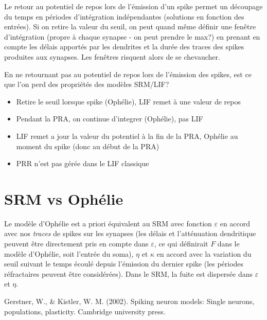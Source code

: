 \documentclass{article}
\begin{document}
	Le retour au potentiel de repos lors de l'émission d'un spike permet un découpage du temps en périodes d'intégration indépendantes (solutions en fonction des entrées). Si on retire la valeur du seuil, on peut quand même définir une fenêtre d'intégration (propre à chaque synapse - on peut prendre le max?) en prenant en compte les délais apportés par les dendrites et la durée des traces des spikes produites aux synapses. Les fenêtres risquent alors de se chevaucher. 

	En ne retournant pas au potentiel de repos lors de l'émission des spikes, est ce que l'on perd des propriétés des modèles SRM/LIF?

	\begin{itemize}
		\item Retire le seuil lorsque spike (Oph\'elie), LIF remet \`a une valeur de repos
		\item Pendant la PRA, on continue d'integrer (Oph\'elie), pas LIF
		\item LIF remet a jour la valeur du potentiel \`a la fin de la PRA, Oph\'elie au moment du spike (donc au d\'ebut de la PRA)
		\item PRR n'est pas g\'er\'ee dans le LIF classique
	\end{itemize}

\section*{SRM vs Ophélie}
	Le modèle d'Ophélie est a priori équivalent au SRM avec fonction $\varepsilon$ en accord avec nos \emph{traces} de spikes sur les synapses (les délais et l'atténuation dendritique peuvent être directement pris en compte dans $\varepsilon$, ce qui définirait $F$ dans le modèle d'Ophélie, soit l'entrée du soma), $\eta$ et $\kappa$ en accord avec la variation du seuil suivant le temps écoulé depuis l'émission du dernier spike (les périodes réfractaires peuvent être considérées). 
	Dans le SRM, la fuite est dispersée dans $\varepsilon$ et $\eta$.


	

	\begin{thebibliography}{10}
		 Gerstner, W., \& Kistler, W. M. (2002). Spiking neuron models: Single neurons, populations, plasticity. Cambridge university press.
	\end{thebibliography}













		
\end{document}
